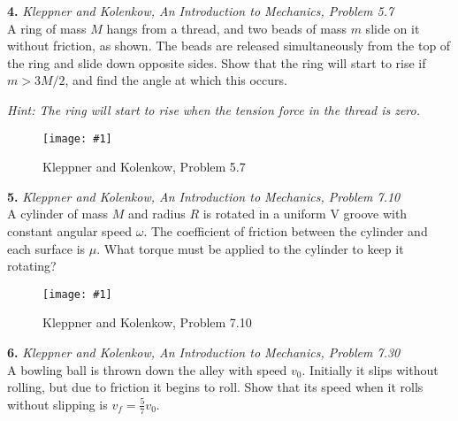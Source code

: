 \documentclass[11pt]{article}
\newcommand{\fig}[4]{
    \begin{figure}[H]
        \centering
        \texttt{[image: \#1]}
        \caption{#2}
        \label{exp4fit}
    \end{figure}
}
\theoremstyle{gangnamstyle}{\newtheorem{definition}{Definition}[]}
\theoremstyle{gangnamstyle}{\newtheorem{example}{Example}[]}
\theoremstyle{gangnamstyle}{\newtheorem{problem}{Problem}[]}
\begin{document}
\pagebreak

\textbf{4.} \textit{Kleppner and Kolenkow, An Introduction to Mechanics, Problem 5.7} \\
A ring of mass $M$ hangs from a thread, and two beads of mass $m$ slide on it without friction, as shown. The beads are released simultaneously from the top of the ring and slide down opposite sides. Show that the ring will start to rise if $m > 3M/2$, and find the angle at which this occurs.

\textit{Hint: The ring will start to rise when the tension force in the thread is zero.}

\fig{figs/0723/kk57.png}{Kleppner and Kolenkow, Problem 5.7}{0.6}{0}

\pagebreak

\textbf{5.} \textit{Kleppner and Kolenkow, An Introduction to Mechanics, Problem 7.10} \\
A cylinder of mass $M$ and radius $R$ is rotated in a uniform V groove with constant angular speed $\omega$. The coefficient of friction between the cylinder and each surface is $\mu$. What torque must be applied to the cylinder to keep it rotating?

\fig{figs/0723/kk710.png}{Kleppner and Kolenkow, Problem 7.10}{0.6}{0}

\pagebreak

\textbf{6.} \textit{Kleppner and Kolenkow, An Introduction to Mechanics, Problem 7.30} \\
A bowling ball is thrown down the alley with speed $v_0$. Initially it slips without rolling, but due to friction it begins to roll. Show that its speed when it rolls without slipping is $v_f = \frac{5}{7}v_0$. 
\end{document}

